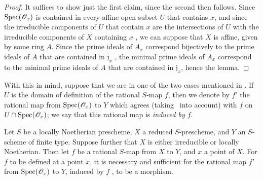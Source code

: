 \begin{proof}
It suffices to show just the first claim, since the second then follows.
Since $\operatorname{Spec}(\mathscr{O}_x)$ is contained in every affine open subset $U$ that contains $x$, and since the irreducible components of $U$ that contain $x$ are the intersections of $U$ with the irreducible components of $X$ containing $x$ , we can suppose that $X$ is affine, given by some ring $A$.
Since the prime ideals of $A_x$ correspond bijectively to the prime ideals of $A$ that are
contained in $\mathfrak{j}_x$ , the minimal prime ideals of $A_x$ correspond to the minimal prime ideals of $A$ that are contained in $\mathfrak{j}_x$, hence the lemma.
\end{proof}

With this in mind, suppose that we are in one of the two cases mentioned in .
If $U$ is the domain of definition of the rational $S$-map $f$, then we denote by $f'$ the rational map from $\operatorname{Spec}(\mathscr{O}_x)$ to $Y$ which agrees (taking~ into account) with $f$ on $U\cap\operatorname{Spec}(\mathscr{O}_x)$; we say that this rational map is \emph{induced by $f$}.

\begin{proposition}[7.2.9]
\label{I.7.2.9}
Let $S$ be a locally Noetherian prescheme, $X$ a reduced $S$-prescheme, and $Y$ an $S$-scheme of finite type.
Suppose further that $X$ is either irreducible or locally Noetherian.
Then let $f$ be a rational $S$-map from $X$ to $Y$, and $x$ a point of $X$.
For $f$ to be defined at a point $x$, it is necessary and sufficient for the rational map $f'$ from $\operatorname{Spec}(\mathscr{O}_x)$ to $Y$, induced by $f$ , to be a morphism.
\end{proposition}

